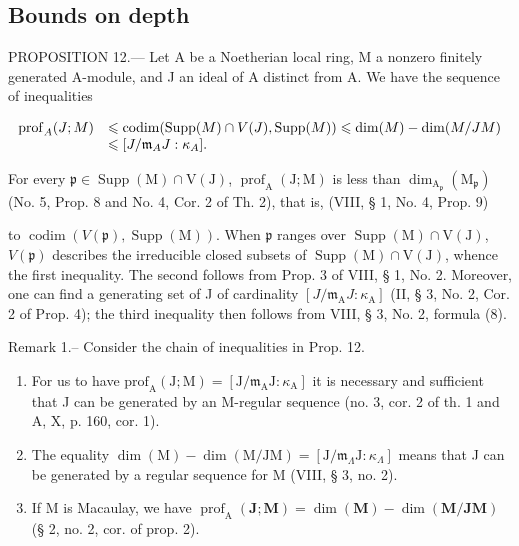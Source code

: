 \subsection{Bounds on depth}

PROPOSITION 12.--- Let A be a Noetherian local ring, M a nonzero finitely generated A-module, and J an ideal of A distinct from A. We have the sequence of inequalities

\[
\begin{array}{r l} \operatorname{prof} _ {A} (J; M) & \leqslant \operatorname{codim} (\operatorname{Supp} (M) \cap V (J), \operatorname{Supp} (M)) \leqslant \dim (M) - \dim (M / J M) \\ & \leqslant [ J / \mathfrak {m} _ {A} J: \kappa_ {A} ]. \end{array}
\]

For every \(\mathfrak{p} \in \operatorname{Supp}(\mathrm{M})\cap \mathrm{V}(\mathrm{J})\), \(\operatorname{prof}_{\mathrm{A}}(\mathrm{J};\mathrm{M})\) is less than \(\dim_{\mathrm{A}_{\mathfrak{p}}}(\mathrm{M}_{\mathfrak{p}})\) (No. 5, Prop. 8 and No. 4, Cor. 2 of Th. 2), that is, (VIII, § 1, No. 4, Prop. 9)

to \(\operatorname{codim}(V(\mathfrak{p}),\operatorname{Supp}(\mathrm{M}))\). When \(\mathfrak{p}\) ranges over \(\operatorname{Supp}(\mathrm{M}) \cap \mathrm{V}(\mathrm{J})\), \(V(\mathfrak{p})\) describes the irreducible closed subsets of \(\operatorname{Supp}(\mathrm{M}) \cap \mathrm{V}(\mathrm{J})\), whence the first inequality. The second follows from Prop. 3 of VIII, § 1, No. 2. Moreover, one can find a generating set of J of cardinality \([J/\mathfrak{m}_{\mathrm{A}}J:\kappa_{\mathrm{A}}]\) (II, § 3, No. 2, Cor. 2 of Prop. 4); the third inequality then follows from VIII, § 3, No. 2, formula (8).

Remark 1.-- Consider the chain of inequalities in Prop. 12.

\begin{enumerate}
\def\labelenumi{\alph{enumi})}
\item
  For us to have \(\mathrm{prof}_{\mathrm{A}}(\mathrm{J};\mathrm{M}) = [\mathrm{J} / \mathfrak{m}_{\mathrm{A}}\mathrm{J}:\kappa_{\mathrm{A}}]\) it is necessary and sufficient that J can be generated by an M-regular sequence (no. 3, cor. 2 of th. 1 and A, X, p. 160, cor. 1).
\item
  The equality \(\dim(\mathrm{M}) - \dim(\mathrm{M}/\mathrm{JM}) = [\mathrm{J}/\mathfrak{m}_{\Lambda}\mathrm{J} : \kappa_{\Lambda}]\) means that J can be generated by a regular sequence for M (VIII, § 3, no. 2).
\item
  If M is Macaulay, we have \(\operatorname{prof}_{\mathrm{A}}(\mathbf{J};\mathbf{M}) = \dim (\mathbf{M}) - \dim (\mathbf{M} / \mathbf{JM})\) (§ 2, no. 2, cor. of prop. 2).
\end{enumerate}

